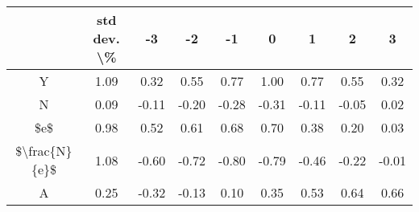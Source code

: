 \begin{tabular}{ccccccccc}
\toprule
{} & std dev. \textbackslash \% &     -3 &     -2 &     -1 &      0 &      1 &      2 &      3 \\
\midrule
Y             &        1.09 &   0.32 &   0.55 &   0.77 &   1.00 &   0.77 &   0.55 &   0.32 \\
N             &        0.09 &  -0.11 &  -0.20 &  -0.28 &  -0.31 &  -0.11 &  -0.05 &   0.02 \\
\$e\$           &        0.98 &   0.52 &   0.61 &   0.68 &   0.70 &   0.38 &   0.20 &   0.03 \\
\$\textbackslash frac\{N\}\{e\}\$ &        1.08 &  -0.60 &  -0.72 &  -0.80 &  -0.79 &  -0.46 &  -0.22 &  -0.01 \\
A             &        0.25 &  -0.32 &  -0.13 &   0.10 &   0.35 &   0.53 &   0.64 &   0.66 \\
\bottomrule
\end{tabular}

